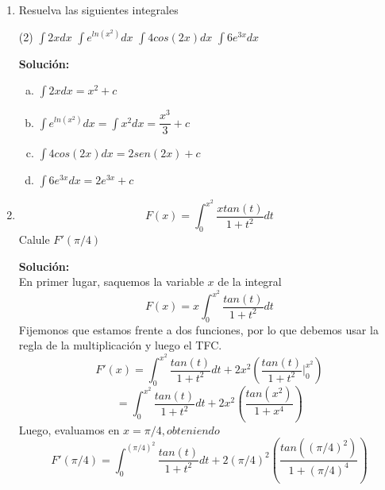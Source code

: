 \documentclass[12pt]{article}
\newenvironment{solucion}
{\begin{mdframed}[backgroundcolor=black!10]
		{\bf Solución:}\\
	}
	{
	\end{mdframed}
}
\newenvironment{preguntas}
{\begin{enumerate}\itemsep12pt
	}
	{
	\end{enumerate}
}
\newcommand{\ev}{\Big|}
\newcommand{\ra}{\rightarrow}
\begin{document}
\begin{preguntas}
\begin{solucion}
		$$ = \lim\limits_{n\ra \infty} \sum\limits_{k=0}^n \dfrac{1}{n\left(1+\dfrac{3k}{n}\right)}$$
		$$ = \dfrac{1}{3} \lim\limits_{n\ra \infty} \dfrac{3}{n} \sum\limits_{k=0}^n \dfrac{1}{1+\dfrac{3k}{n}}$$
		Llegamos a una suma de Riemann, que esta asociada a la función $f(x) = \dfrac{1}{1+x}$ en el intervalo $[0, 3]$, por lo que
		$$\lim\limits_{n\ra \infty} \sum\limits_{k=0}^n \dfrac{1}{n+3k} = \dfrac{1}{3} \displaystyle\int_0^3 \dfrac{dx}{1+x}$$
\end{solucion}
\item Resuelva las siguientes integrales
\begin{tasks}(2)
\task $\displaystyle\int 2xdx$
\task $\displaystyle\int e^{ln(x^2)}dx$
\task $\displaystyle\int 4cos(2x)dx$
\task $\displaystyle\int 6e^{3x}dx$
\end{tasks}
\begin{solucion}

\begin{enumerate}[a)]
\item $\displaystyle\int 2xdx = x^2 + c$
\item $\displaystyle\int e^{ln(x^2)}dx = \displaystyle\int x^2dx = \dfrac{x^3}{3} + c$
\item $\displaystyle\int 4cos(2x)dx = 2sen(2x) + c$
\item $\displaystyle\int 6e^{3x}dx = 2e^{3x} + c$
\end{enumerate}
\end{solucion}
\item $$F(x) = \displaystyle\int_0^{x^2} \dfrac{xtan(t)}{1+t^2}dt$$
	Calule $F'(\pi /4)$
\begin{solucion}
En primer lugar, saquemos la variable $x$ de la integral
		$$F(x) = x\displaystyle\int_0^{x^2} \dfrac{tan(t)}{1+t^2}dt$$
		Fijemonos que estamos frente a dos funciones, por lo que debemos usar la regla de la multiplicación y luego el TFC.
		$$F'(x) = \displaystyle\int_0^{x^2} \dfrac{tan(t)}{1+t^2}dt + 2x^2\left(\dfrac{tan(t)}{1+t^2}\ev_0^{x^2}\right)$$
		$$= \displaystyle\int_0^{x^2} \dfrac{tan(t)}{1+t^2}dt + 2x^2\left(\dfrac{tan(x^2)}{1+x^4}\right)$$
		Luego, evaluamos en $x = \pi /4, obteniendo$
		$$F'(\pi /4) = \displaystyle\int_0^{(\pi /4)^2} \dfrac{tan(t)}{1+t^2}dt + 2(\pi /4)^2\left(\dfrac{tan((\pi /4)^2)}{1+(\pi /4)^4}\right)$$
\end{solucion}
\end{preguntas}
\end{document}
